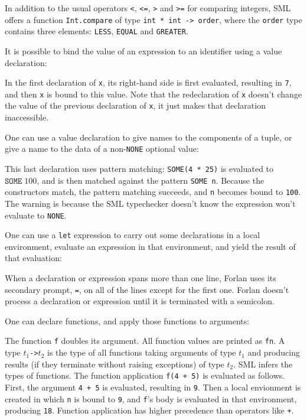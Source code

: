 In addition to the usual operators \texttt{<}, \texttt{<=}, \texttt{>}
and \texttt{>=} for comparing integers, SML offers a function
\texttt{Int.compare} of type \texttt{int~*~int~->~order}, where the
\texttt{order} type contains three elements: \texttt{LESS},
\texttt{EQUAL} and \texttt{GREATER}.  

It is possible to bind the value of an expression to an
identifier using a value declaration:
%
%

In the first declaration of \texttt{x}, its right-hand side is first
evaluated, resulting in \texttt{7}, and then \texttt{x} is bound to
this value.  Note that the redeclaration of \texttt{x} doesn't change
the value of the previous declaration of \texttt{x}, it just makes
that declaration inaccessible.

One can use a value declaration to give names to the
components of a tuple, or give a name to the data of a
non-\texttt{NONE} optional value:

This last declaration uses pattern matching: \texttt{SOME(4~*~25)}
is evaluated to $\mathtt{SOME}\;100$, and is then matched against the
pattern \texttt{SOME~n}.  Because the constructors match, the
pattern matching succeeds, and \texttt{n} becomes bound to \texttt{100}.
The warning is because the SML typechecker doesn't know the
expression won't evaluate to \texttt{NONE}.

One can use a \texttt{let} expression to carry out some declarations
in a local environment, evaluate an expression in that environment, and
yield the result of that evaluation:

When a declaration or expression spans more than one line, Forlan
uses its secondary prompt, \texttt{=}, on all of the lines except
%
%
for the first one.  Forlan doesn't process a declaration or expression
until it is terminated with a semicolon.
%

One can declare functions, and apply those functions to arguments:%
%
%

The function \texttt{f} doubles its argument.
All function values are printed as \texttt{fn}.
%
A type \texttt{$t_1$\;->\;$t_2$} is the type of all functions taking
%
arguments of type $t_1$ and producing results (if they terminate
without raising exceptions) of type $t_2$.  SML infers the types of
functions.  The function application \texttt{f(4~+~5)} is evaluated as
follows.  First, the argument \texttt{4~+~5} is evaluated, resulting
in \texttt{9}.  Then a local envionment is created in which \texttt{n}
is bound to \texttt{9}, and \texttt{f}'s body is evaluated in that
environment, producing \texttt{18}.  Function application has higher
precedence than operators like \texttt{+}.

